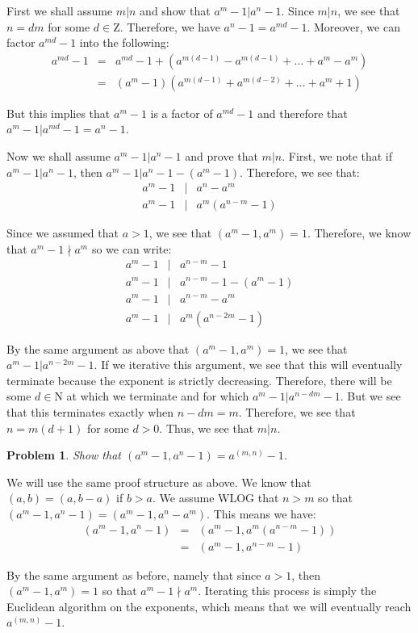 \documentclass[psamsfonts]{amsart}
\newtheorem{prob}{Problem}[section]
\newenvironment{sol}{{\bfseries Solution}}{\qedsymbol}
\theoremstyle{definition}
\theoremstyle{remark}
\numberwithin{equation}{section}
\begin{document}
\begin{sol}
First we shall assume $m|n$ and show that $a^m - 1 | a^n - 1$. Since $m | n$, we see that $n = dm$ for some $d \in \mathrm{Z}$. Therefore, we have $a^n - 1 = a^{md} - 1$. Moreover, we can factor $a^{md} - 1$ into the following:
\begin{eqnarray}
a^{md} - 1 &=& a^{md} - 1 + (a^{m(d-1)} - a^{m(d-1)} + \ldots + a^{m} - a^{m}) \\
&=&  (a^m - 1)(a^{m(d - 1)} + a^{m(d-2)} + \ldots + a^{m} + 1)
\end{eqnarray}

But this implies that $a^m - 1$ is a factor of $a^{md} - 1$ and therefore that $a^m - 1 | a^{md} - 1 = a^{n} - 1$.  

Now we shall assume $a^{m} - 1 | a^n - 1$ and prove that $m|n$. First, we note that if $a^{m} - 1 | a^n - 1$, then $a^{m} - 1 | a^n - 1 - (a^m - 1)$. Therefore, we see that:
\begin{eqnarray}
a^m - 1 &|& a^{n} - a^m \\
a^m - 1 &|& a^m (a^{n - m} - 1) 
\end{eqnarray}

Since we assumed that $a > 1$, we see that $(a^m - 1, a^m) = 1$. Therefore, we know that $a^m - 1 \nmid a^m$ so we can write:
\begin{eqnarray}
a^m - 1 &|& a^{n - m} - 1 \\
a^m - 1 &|& a^{n - m} - 1 - (a^m - 1) \\
a^m - 1 &|& a^{n - m} - a^m \\
a^m - 1 &|& a^m (a^{n - 2m} - 1) 
\end{eqnarray}

By the same argument as above that $(a^m - 1, a^m) = 1$, we see that $a^m - 1 | a^{n - 2m} - 1$. If we iterative this argument, we see that this will eventually terminate because the exponent is strictly decreasing. Therefore, there will be some $d \in \mathrm{N}$ at which we terminate and for which $a^m - 1 | a^{n - dm} - 1$. But we see that this terminates exactly when $n - dm = m$. Therefore, we see that $n = m(d + 1)$ for some $d > 0$. Thus, we see that $m | n$. 
\end{sol}

\begin{prob}
Show that $(a^m - 1, a^n - 1) = a^{(m,n)} - 1$.
\end{prob}

\begin{sol}
We will use the same proof structure as above. We know that $(a,b) = (a, b-a)$ if $b > a$. We assume WLOG that $n > m$ so that $(a^{m} - 1, a^n - 1) = (a^m - 1, a^n - a^m)$. This means we have:
\begin{eqnarray}
(a^m - 1, a^n - 1) &=& (a^m - 1, a^m(a^{n-m} - 1)) \\
&=& (a^m - 1, a^{n - m} - 1) 
\end{eqnarray}

By the same argument as before, namely that since $a > 1$, then $(a^m - 1, a^m) = 1$ so that $a^m - 1 \nmid a^m$. Iterating this process is simply the Euclidean algorithm on the exponents, which means that we will eventually reach $a^{(m,n)} - 1$. 
\end{sol}
\end{document}
